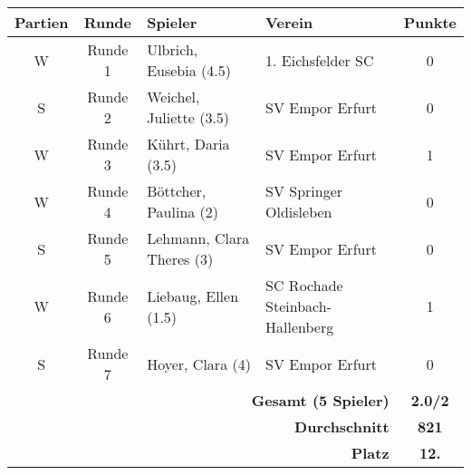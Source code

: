 \begin{table}[H]
\begin{tabular}{|c|c|l|l|c|}
\hline
\textbf{Partien} & \textbf{Runde} & \textbf{Spieler} & \textbf{Verein} & \textbf{Punkte} \\ \hline
W & Runde 1 & Ulbrich, Eusebia (4.5) & 1. Eichsfelder SC & 0 \\ \hline
S & Runde 2 & Weichel, Juliette (3.5) & SV Empor Erfurt & 0 \\ \hline
W & Runde 3 & Kührt, Daria (3.5) & SV Empor Erfurt & 1 \\ \hline
W & Runde 4 & Böttcher, Paulina (2) & SV Springer Oldisleben & 0 \\ \hline
S & Runde 5 & Lehmann, Clara Theres (3) & SV Empor Erfurt & 0 \\ \hline
W & Runde 6 & Liebaug, Ellen (1.5) & SC Rochade Steinbach-Hallenberg & 1 \\ \hline
S & Runde 7 & Hoyer, Clara (4) & SV Empor Erfurt & 0 \\ \hline
\multicolumn{4}{|r|}{\textbf{Gesamt (5 Spieler)}} & \textbf{2.0/2} \\ \hline
\multicolumn{4}{|r|}{\textbf{Durchschnitt}} & \textbf{821} \\ \hline
\multicolumn{4}{|r|}{\textbf{Platz}} & \textbf{12.} \\ \hline
\end{tabular}
\end{table}